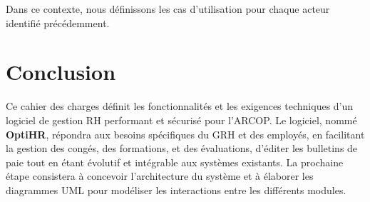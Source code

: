 Dans ce contexte, nous définissons les cas d'utilisation pour chaque acteur identifié précédemment.

\section{Conclusion}
Ce cahier des charges définit les fonctionnalités et les exigences techniques d'un logiciel de gestion RH performant et sécurisé pour l'ARCOP. Le logiciel, nommé \textbf{OptiHR}, répondra aux besoins spécifiques du GRH et des employés, en facilitant la gestion des congés, des formations, et des évaluations, d'éditer les bulletins de paie tout en étant évolutif et intégrable aux systèmes existants. La prochaine étape consistera à concevoir l'architecture du système et à élaborer les diagrammes UML pour modéliser les interactions entre les différents modules.
\clearpage
